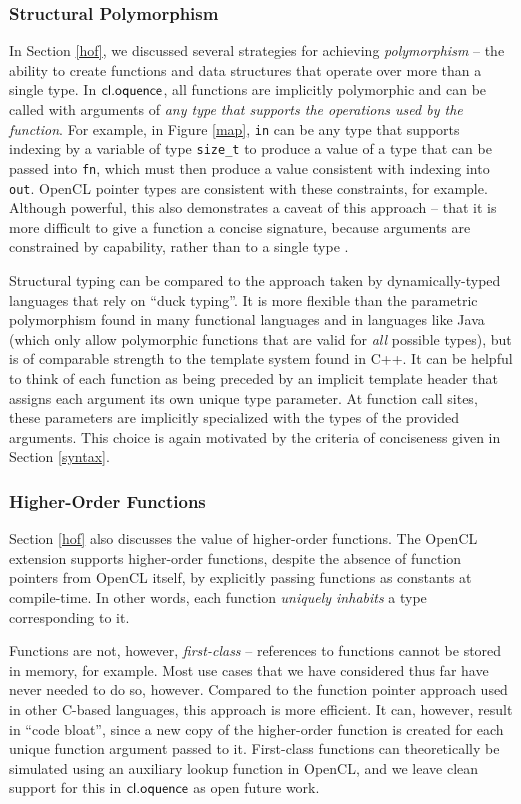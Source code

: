 \documentclass[10pt, conference, compsocconf]{IEEEtran}
\begin{document}
\subsubsection{Structural Polymorphism}
In Section \ref{hof}, we discussed several strategies for achieving {\it polymorphism} -- the ability to create functions and data structures that operate over more than a single type. In $\textsf{cl.oquence}$, all functions are implicitly polymorphic and can be called with arguments of {\it any type that supports the operations used by the function}. For example, in Figure \ref{map}, \verb|in| can be any type that supports indexing by a variable of type \verb|size_t| to produce a value of a type that can be passed into \verb|fn|, which must then produce a value consistent with indexing into \verb|out|. OpenCL pointer types are consistent with these constraints, for example. Although powerful, this also demonstrates a caveat of this approach -- that it is more difficult to give a function a concise signature, because arguments are constrained by capability, rather than to a single type \cite{malayeri2009structural}.

Structural typing can be compared to the approach taken by dynamically-typed languages that rely on ``duck typing''. It is more flexible than the parametric polymorphism found in many functional languages and in languages like Java (which only allow polymorphic functions that are valid for {\it all} possible types), but is of comparable strength to the template system found in C++. It can be helpful to think of each function as being preceded by an implicit template header that assigns each argument its own unique type parameter. At function call sites, these parameters are implicitly specialized with the types of the provided arguments. This choice is again motivated by the criteria of conciseness given in Section \ref{syntax}.

\subsubsection{Higher-Order Functions}
Section \ref{hof} also discusses the value of higher-order functions. The OpenCL extension supports higher-order functions, despite the absence of function pointers from OpenCL itself, by explicitly passing functions as constants at compile-time. In other words, each function {\it uniquely inhabits} a type corresponding to it.

Functions are not, however, {\it first-class} -- references to functions cannot be stored in memory, for example. Most use cases that we have considered thus far have never needed to do so, however. Compared to the function pointer approach used in other C-based languages, this approach is more efficient. It can, however, result in ``code bloat'', since a new copy of the higher-order function is created for each unique function argument passed to it. First-class functions can theoretically be simulated using an auxiliary lookup function in OpenCL, and we leave clean support for this in $\textsf{cl.oquence}$ as open future work.
\end{document}
